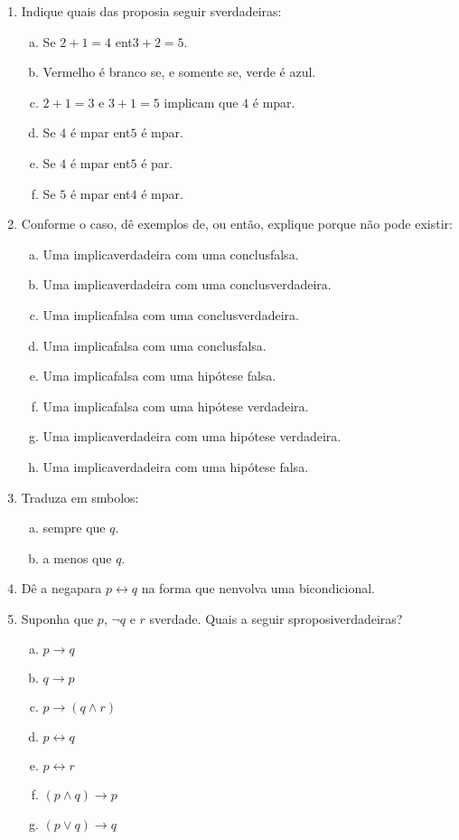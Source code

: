 \begin{enumerate}[{\bf 1.}]
\item Indique quais das proposi\coes a seguir s\ao verdadeiras:
\begin{enumerate}[a)]
\item Se $2+1=4$ ent\ao $3+2=5$.
\item Vermelho \'e branco se, e somente se, verde \'e azul.
\item $2+1=3$ e $3+1=5$ implicam que $4$ \'e \ih mpar.
\item Se $4$ \'e \ih mpar ent\ao $5$ \'e \ih mpar.
\item Se $4$ \'e \ih mpar ent\ao $5$ \'e par.
\item Se $5$ \'e \ih mpar ent\ao $4$ \'e \ih mpar. 
\end{enumerate}

\item Conforme o caso, dê  exemplos de, ou então, explique porque não pode existir:
\begin{enumerate}[a)]
\item Uma implica\cao verdadeira com uma conclus\ao falsa.
\item Uma implica\cao verdadeira com uma conclus\ao verdadeira.
\item Uma implica\cao falsa com uma conclus\ao verdadeira.
\item Uma implica\cao falsa com uma conclus\ao falsa.
\item Uma implica\cao falsa com uma hip\'otese falsa.
\item Uma implica\cao falsa com uma hip\'otese verdadeira.
\item Uma implica\cao verdadeira com uma hip\'otese verdadeira.
\item Uma implica\cao verdadeira com uma hip\'otese falsa. 
\end{enumerate}

\item Traduza em s\ih mbolos:
\begin{enumerate}[a)]
\item \pp sempre que $q$.
\item \pp a menos que $q$.
\end{enumerate}

\item D\^e a nega\cao para $p \leftrightarrow q$ na forma que n\ao envolva uma bicondicional.

\item Suponha que $p$, $\lnot q$ e $r$ s\ao verdade. Quais a seguir s\ao proposi\coes verdadeiras?
\begin{multicols}{2}
\begin{enumerate}[a)]
\item $p \to q$
\item $q \to p$
\item $p \to (q \wedge r)$
\item $p \leftrightarrow q$
\item $p \leftrightarrow r$
\item $(p \wedge q) \to p$
\item $(p \vee q) \to q$
\end{enumerate}
\end{multicols}


\end{enumerate}
